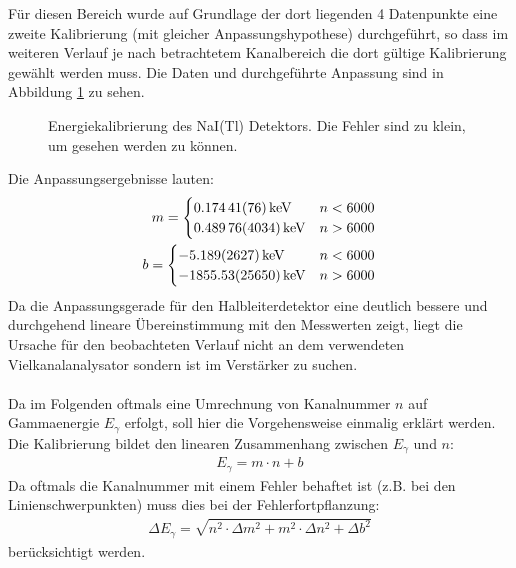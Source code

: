\documentclass[11pt, a4paper]{article}
\numberwithin{equation}{section}
\begin{document}
Für diesen Bereich wurde auf Grundlage der dort liegenden \num{4} Datenpunkte eine zweite Kalibrierung (mit gleicher Anpassungshypothese) durchgeführt, so dass im weiteren Verlauf je nach betrachtetem Kanalbereich die dort gültige Kalibrierung gewählt werden muss. 
Die Daten und durchgeführte Anpassung sind in Abbildung \ref{fig:kalibrierung_szinti} zu sehen.
\begin{figure}[ht]
	\centering
	
	\caption{Energiekalibrierung des NaI(Tl) Detektors. Die Fehler sind zu klein, um gesehen werden zu können.}
	\label{fig:kalibrierung_szinti}
\end{figure}
Die Anpassungsergebnisse lauten:
\begin{align}
	m = 
	\begin{cases}
	\SI{0.17441+-0.00076}{\kilo\electronvolt} & n < 6000 \\
	\SI{0.48976+-0.04034}{\kilo\electronvolt} & n > 6000
	\end{cases}\\
	b = 
	\begin{cases}
	\SI{-5.189+-2.627}{\kilo\electronvolt} & n < 6000 \\
	\SI{-1855.53+-256.50}{\kilo\electronvolt} & n > 6000
	\end{cases}
\end{align}
Da die Anpassungsgerade für den Halbleiterdetektor eine deutlich bessere und durchgehend lineare Übereinstimmung mit den Messwerten zeigt, liegt die Ursache für den beobachteten Verlauf nicht an dem verwendeten Vielkanalanalysator sondern ist im Verstärker zu suchen.\\
\\
Da im Folgenden oftmals eine Umrechnung von Kanalnummer $n$ auf Gammaenergie $E_\gamma$ erfolgt, soll hier die Vorgehensweise einmalig erklärt werden.
Die Kalibrierung bildet den linearen Zusammenhang zwischen $E_\gamma$ und $n$:
\begin{align}
	E_\gamma = m \cdot n + b
\end{align}
Da oftmals die Kanalnummer mit einem Fehler behaftet ist (z.B. bei den Linienschwerpunkten) muss dies bei der Fehlerfortpflanzung:
\begin{align}
	\Delta E_\gamma = \sqrt{n^2 \cdot \Delta m^2 + m^2 \cdot \Delta n^2 + \Delta b^2}
\end{align}
berücksichtigt werden.
\end{document}
